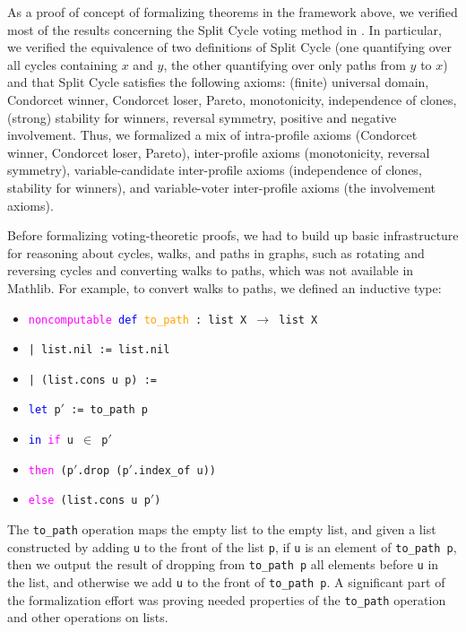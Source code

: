 \documentclass[runningheads]{llncs}
\begin{document}
As a proof of concept of formalizing theorems in the framework above, we verified most of the results concerning the Split Cycle voting method in \cite{HP2020}. In particular, we verified the equivalence of two definitions of Split Cycle (one quantifying over all cycles containing $x$ and $y$, the other quantifying over only paths from $y$ to $x$) and that Split Cycle satisfies the following axioms: (finite) universal domain, Condorcet winner, Condorcet loser, Pareto, monotonicity, independence of clones, (strong) stability for winners, reversal symmetry, positive and negative involvement. Thus, we formalized a mix of intra-profile axioms (Condorcet winner, Condorcet loser, Pareto), inter-profile axioms (monotonicity, reversal symmetry), variable-candidate inter-profile axioms (independence of clones, stability for winners), and variable-voter inter-profile axioms (the involvement axioms). 



Before formalizing voting-theoretic proofs, we had to build up basic infrastructure for reasoning about cycles, walks, and paths in graphs, such as rotating and reversing cycles and converting walks to paths, which was not available in Mathlib. For example, to convert walks to paths, we defined an inductive type:
\begin{itemize}
\item[] \texttt{\textcolor{magenta}{noncomputable} \textcolor{blue}{def} \textcolor{orange}{to\_path} : list X $\to$ list X}
\item[] \texttt{| list.nil := list.nil}
\item[] \texttt{| (list.cons u p) :=}
\item[]    \quad\texttt{\textcolor{blue}{let} p$'$ := to\_path p}
\item[]    \quad\texttt{\textcolor{blue}{in} \textcolor{magenta}{if} u $\in$ p$'$}
 \item[]     \qquad  \texttt{\textcolor{magenta}{then} (p$'$.drop (p$'$.index\_of u))}
 \item[]       \qquad \texttt{\textcolor{magenta}{else} (list.cons u p$'$)}
 \end{itemize}
The \texttt{to\_path} operation maps the empty list to the empty list, and given a list constructed by adding \texttt{u} to the front of the list \texttt{p},  if \texttt{u} is an element of \texttt{to\_path p}, then we output the result of dropping from \texttt{to\_path p} all elements before \texttt{u} in the list, and otherwise we add \texttt{u} to the front of \texttt{to\_path p}. A significant part of the formalization effort was proving needed properties of the \texttt{to\_path} operation and other operations on lists.
\end{document}
